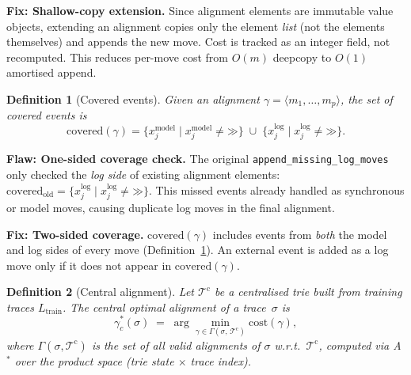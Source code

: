\documentclass[11pt,a4paper]{article}
\newtheorem{definition}{Definition}
\newcommand{\T}{\mathcal{T}}
\newcommand{\Tc}{\T^{\mathrm{c}}}
\newcommand{\cost}{\mathrm{cost}}
\newcommand{\alignment}{\gamma}
\newcommand{\SKIP}{\mathord{\gg}}
\newcommand{\trace}{\sigma}
\newcommand{\cov}{\mathrm{covered}}
\begin{document}
\begin{newboxelem}
\textbf{Fix: Shallow-copy extension.}\;
Since alignment elements are immutable value objects, extending an
alignment copies only the element \emph{list} (not the elements
themselves) and appends the new move.  Cost is tracked as an integer
field, not recomputed.  This reduces per-move cost from $O(m)$ deepcopy
to $O(1)$ amortised append.
\end{newboxelem}

\begin{definition}[Covered events]\label{def:covered}
  Given an alignment $\alignment = \langle m_1, \ldots, m_p \rangle$,
  the set of \emph{covered events} is
  \[
    \cov(\alignment) = \{ x_j^{\mathrm{model}} \mid x_j^{\mathrm{model}} \neq \SKIP \}
    \;\cup\;
    \{ x_j^{\mathrm{log}} \mid x_j^{\mathrm{log}} \neq \SKIP \}.
  \]
\end{definition}

\begin{oldbox}
\textbf{Flaw: One-sided coverage check.}\;
The original \texttt{append\_missing\_log\_moves} only checked the
\emph{log side} of existing alignment elements:
$\cov_{\text{old}} = \{ x_j^{\mathrm{log}} \mid x_j^{\mathrm{log}} \neq \SKIP \}$.
This missed events already handled as synchronous or model moves, causing
duplicate log moves in the final alignment.
\end{oldbox}

\begin{newboxelem}
\textbf{Fix: Two-sided coverage.}\;
$\cov(\alignment)$ includes events from \emph{both} the model and log
sides of every move (Definition~\ref{def:covered}).  An external event
is added as a log move only if it does not appear in $\cov(\alignment)$.
\end{newboxelem}

\begin{definition}[Central alignment]\label{def:central-alignment}
  Let $\Tc$ be a centralised trie built from training traces
  $L_{\mathrm{train}}$.
  The \emph{central optimal alignment} of a trace~$\trace$ is
  \[
    \alignment^{*}_c(\trace)
    \;=\;
    \arg\min_{\alignment \in \Gamma(\trace,\,\Tc)}
      \cost(\alignment),
  \]
  where $\Gamma(\trace, \Tc)$ is the set of all valid alignments
  of $\trace$ w.r.t.\ $\Tc$, computed via A$^{*}$ over the
  product space (trie state $\times$ trace index).
\end{definition}

\end{document}
